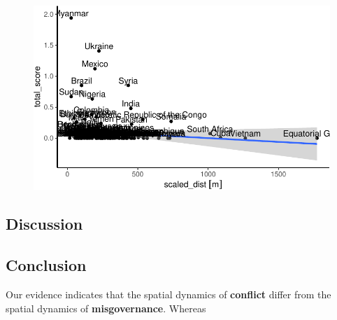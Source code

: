 \documentclass[
  letterpaper,
  DIV=11,
  numbers=noendperiod]{scrartcl}
\begin{document}
\begin{figure}[H]

{\centering \includegraphics{index_files/figure-pdf/unnamed-chunk-5-1.pdf}

}

\end{figure}

\hypertarget{discussion}{%
\subsection{Discussion}\label{discussion}}

\hypertarget{conclusion}{%
\subsection{Conclusion}\label{conclusion}}

Our evidence indicates that the spatial dynamics of \textbf{conflict}
differ from the spatial dynamics of \textbf{misgovernance}. Whereas
\end{document}
